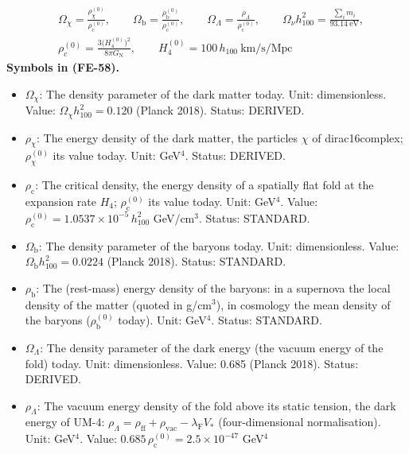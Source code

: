 \documentclass[
  10pt,
]{article}
\providecommand{\tightlist}{%
  \setlength{\itemsep}{0pt}\setlength{\parskip}{0pt}}
\begin{document}
\[
\begin{aligned}
&\Omega_\chi = \frac{\rho_\chi^{(0)}}{\rho_{\mathrm{c}}^{(0)}},\qquad \Omega_{\mathrm{b}} = \frac{\rho_{\mathrm{b}}^{(0)}}{\rho_{\mathrm{c}}^{(0)}},\qquad
 \Omega_\Lambda = \frac{\rho_\Lambda}{\rho_{\mathrm{c}}^{(0)}},\qquad \Omega_\nu h_{100}^2 = \frac{\sum_im_i}{93.14\ \text{eV}},\\
&\rho_{\mathrm{c}}^{(0)} = \frac{3\big(H_4^{(0)}\big)^2}{8\pi G_{\mathrm{N}}},\qquad H_4^{(0)} = 100\,h_{100}\ \text{km/s/Mpc}
\end{aligned} \tag{FE-58}
\] \textbf{Symbols in (FE-58).}

\begin{itemize}
\tightlist
\item
  \(\Omega_\chi\): The density parameter of the dark matter today. Unit:
  dimensionless. Value: \(\Omega_\chi h_{100}^2 = 0.120\) (Planck 2018).
  Status: DERIVED.
\item
  \(\rho_\chi\): The energy density of the dark matter, the particles
  \(\chi\) of dirac16complex; \(\rho_\chi^{(0)}\) its value today. Unit:
  GeV\(^4\). Status: DERIVED.
\item
  \(\rho_{\mathrm{c}}\): The critical density, the energy density of a
  spatially flat fold at the expansion rate \(H_4\);
  \(\rho_{\mathrm{c}}^{(0)}\) its value today. Unit: GeV\(^4\). Value:
  \(\rho_{\mathrm{c}}^{(0)} = 1.0537\times10^{-5}\,h_{100}^2\)
  GeV/cm\(^3\). Status: STANDARD.
\item
  \(\Omega_{\mathrm{b}}\): The density parameter of the baryons today.
  Unit: dimensionless. Value: \(\Omega_{\mathrm{b}}h_{100}^2 = 0.0224\)
  (Planck 2018). Status: STANDARD.
\item
  \(\rho_{\mathrm{b}}\): The (rest-mass) energy density of the baryons:
  in a supernova the local density of the matter (quoted in g/cm\(^3\)),
  in cosmology the mean density of the baryons
  (\(\rho_{\mathrm{b}}^{(0)}\) today). Unit: GeV\(^4\). Status:
  STANDARD.
\item
  \(\Omega_\Lambda\): The density parameter of the dark energy (the
  vacuum energy of the fold) today. Unit: dimensionless. Value: 0.685
  (Planck 2018). Status: DERIVED.
\item
  \(\rho_\Lambda\): The vacuum energy density of the fold above its
  static tension, the dark energy of UM-4:
  \(\rho_\Lambda = \rho_{\mathrm{ff}} + \rho_{\mathrm{vac}} - \lambda_{\mathrm{F}}V_*\)
  (four-dimensional normalisation). Unit: GeV\(^4\). Value:
  \(0.685\,\rho_{\mathrm{c}}^{(0)} = 2.5\times10^{-47}\) GeV\(^4\)

\end{itemize}
\end{document}

